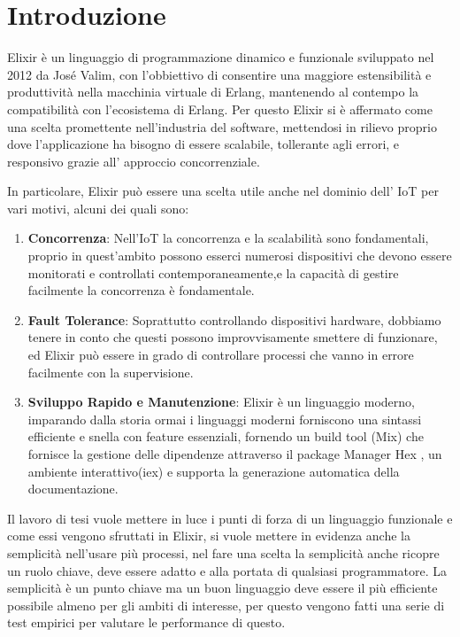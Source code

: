 \chapter{Introduzione}

Elixir è un linguaggio di programmazione dinamico e funzionale
sviluppato nel 2012 da José Valim,
con l'obbiettivo di consentire una maggiore estensibilità
e produttività nella macchinia virtuale di Erlang,
mantenendo al contempo la compatibilità con l'ecosistema
di Erlang\cite{Elixirpr12:online}.
Per questo Elixir si è affermato come una scelta promettente
nell'industria del software, mettendosi in rilievo proprio
dove l'applicazione ha bisogno di essere scalabile, tollerante
agli errori, e responsivo grazie all' approccio concorrenziale.

In particolare, Elixir può essere una scelta utile anche nel
dominio dell' IoT per vari motivi, alcuni dei quali sono: 
\begin{enumerate}
	\item \textbf{Concorrenza}: Nell'IoT la concorrenza
	e la scalabilità sono fondamentali, proprio in quest'ambito
	possono esserci numerosi dispositivi che devono essere monitorati
	e controllati contemporaneamente,e la capacità di gestire
	facilmente la concorrenza è fondamentale.
	\item \textbf{Fault Tolerance}: Soprattutto controllando
	dispositivi hardware, dobbiamo tenere in conto che questi
	possono improvvisamente smettere di funzionare, ed Elixir
	può essere in grado di controllare processi che vanno in
	errore facilmente con la supervisione. 
	\item \textbf{Sviluppo Rapido e Manutenzione}: Elixir è un linguaggio
	moderno, imparando dalla storia ormai i linguaggi moderni forniscono
	una sintassi efficiente e snella con feature essenziali,
	fornendo un build tool (Mix) che fornisce la gestione delle dipendenze
	attraverso il package Manager Hex \cite{Hex63:online},
	un ambiente interattivo(iex) e supporta la generazione automatica della
	documentazione.
\end{enumerate}

Il lavoro di tesi vuole mettere in luce i punti di forza di un linguaggio
funzionale e come essi vengono sfruttati in Elixir, si vuole mettere in
evidenza anche la semplicità nell'usare più processi, nel fare una scelta
la semplicità anche ricopre un ruolo
chiave, deve essere adatto e alla portata di
qualsiasi programmatore. La semplicità è un punto chiave ma un buon linguaggio
deve essere il più efficiente possibile almeno per gli ambiti di interesse,
per questo vengono fatti una serie di test empirici per valutare le performance
di questo.

